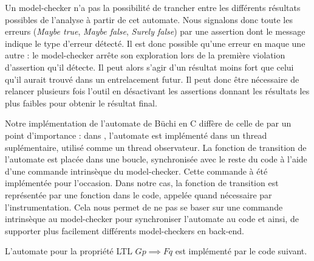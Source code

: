 Un model-checker n'a pas la possibilité de trancher entre les différents
résultats possibles de l'analyse à partir de cet automate. Nous
signalons donc toute les erreurs (\emph{Maybe true}, \emph{Maybe false},
\emph{Surely false}) par une assertion dont le message indique le type
d'erreur détecté. Il est donc possible qu'une erreur en maque une autre
: le model-checker arrête son exploration lors de la première violation
d'assertion qu'il détecte. Il peut alors s'agir d'un résultat moins fort
que celui qu'il aurait trouvé dans un entrelacement futur. Il peut donc
être nécessaire de relancer plusieurs fois l'outil en désactivant les
assertions donnant les résultats les plus faibles pour obtenir le
résultat final.

Notre implémentation de l'automate de Büchi en C diffère de celle de
\cite{morse_ltl} par un point d'importance : dans
\cite{morse_ltl}, l'automate est implémenté dans un thread
suplémentaire, utilisé comme un thread observateur. La fonction de
transition de l'automate est placée dans une boucle, synchronisée avec
le reste du code à l'aide d'une commande intrinsèque du model-checker.
Cette commande à été implémentée pour l'occasion. Dans notre cas, la
fonction de transition est représentée par une fonction dans le code,
appelée quand nécessaire par l'instrumentation. Cela nous permet de ne
pas se baser sur une commande intrinsèque au model-checker pour
synchroniser l'automate au code et ainsi, de supporter plus facilement
différents model-checkers en back-end.

L'automate pour la propriété LTL \(G p \implies F q\) est implémenté par
le code suivant.

